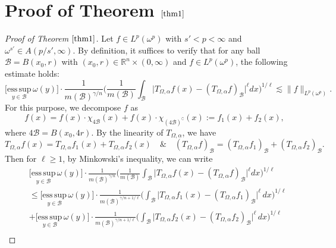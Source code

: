 \documentclass[preprint,10pt]{elsarticle}
\numberwithin{equation}{section}
\begin{document}
\section{Proof of Theorem $\ref{thm1}$}
\begin{proof}[Proof of Theorem $\ref{thm1}$]
Let $f\in L^{p}(\omega^p)$ with $s'<p<\infty$ and $\omega^{s'}\in A(p/{s'},\infty)$. By definition, it suffices to verify that for any ball $\mathcal{B}=B(x_0,r)$ with $(x_0,r)\in\mathbb R^n\times(0,\infty)$ and $f\in L^{p}(\omega^p)$, the following estimate holds:
\begin{equation}\label{mainw}
\Big[\underset{y\in \mathcal{B}}{\mathrm{ess\,sup}}\,\omega(y)\Big]\cdot\frac{1}{m(\mathcal{B})^{\gamma/n}}
\bigg(\frac{1}{m(\mathcal{B})}\int_{\mathcal{B}}\big|T_{\Omega,\alpha}f(x)-(T_{\Omega,\alpha}f)_{\mathcal{B}}\big|^{\ell}dx\bigg)^{1/{\ell}}
\lesssim\|f\|_{L^{p}(\omega^p)}.
\end{equation}
For this purpose, we decompose $f$ as
\begin{equation*}
f(x)=f(x)\cdot\chi_{4\mathcal{B}}(x)+f(x)\cdot\chi_{(4\mathcal{B})^{\complement}}(x):=f_1(x)+f_2(x),
\end{equation*}
where $4\mathcal{B}=B(x_0,4r)$. By the linearity of $T_{\Omega,\alpha}$, we have
\begin{equation*}
T_{\Omega,\alpha}f(x)=T_{\Omega,\alpha}f_1(x)+T_{\Omega,\alpha}f_2(x)\quad \& \quad
(T_{\Omega,\alpha}f)_{\mathcal{B}}=(T_{\Omega,\alpha}f_1)_{\mathcal{B}}+(T_{\Omega,\alpha}f_2)_{\mathcal{B}}.
\end{equation*}
Then for $\ell\geq1$, by Minkowski's inequality, we can write
\begin{equation*}
\begin{split}
&\Big[\underset{y\in \mathcal{B}}{\mathrm{ess\,sup}}\,\omega(y)\Big]\cdot
\frac{1}{m(\mathcal{B})^{\gamma/n}}
\bigg(\frac{1}{m(\mathcal{B})}\int_{\mathcal{B}}\big|T_{\Omega,\alpha}f(x)-(T_{\Omega,\alpha}f)_{\mathcal{B}}\big|^{\ell}dx\bigg)^{1/{\ell}}\\
&\leq\Big[\underset{y\in \mathcal{B}}{\mathrm{ess\,sup}}\,\omega(y)\Big]\cdot
\frac{1}{m(\mathcal{B})^{\gamma/n+1/{\ell}}}
\bigg(\int_{\mathcal{B}}\big|T_{\Omega,\alpha}f_1(x)-(T_{\Omega,\alpha}f_1)_{\mathcal{B}}\big|^{\ell}\,dx\bigg)^{1/{\ell}}\\
&+\Big[\underset{y\in \mathcal{B}}{\mathrm{ess\,sup}}\,\omega(y)\Big]\cdot
\frac{1}{m(\mathcal{B})^{\gamma/n+1/{\ell}}}
\bigg(\int_{\mathcal{B}}\big|T_{\Omega,\alpha}f_2(x)-(T_{\Omega,\alpha}f_2)_{\mathcal{B}}\big|^{\ell}\,dx\bigg)^{1/{\ell}}\\

\end{split}
\end{equation*}
\end{proof}
\end{document}
